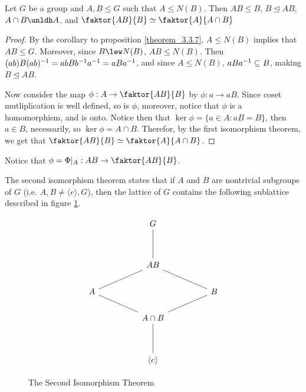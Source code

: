 \begin{theorem}\label{theorem_3.4.4}
  Let $G$ be a group and  $A,B \leq G$ such that  $A \leq N(B)$. Then $AB \leq
  B$,  $B \unlhd AB$,  $A \cap B \unldh A$, and  $\faktor{AB}{B} \simeq
  \faktor{A}{A \cap B}$
\end{theorem}
\begin{proof}
  By the corollary to proposition \ref{theorem_3.3.7}, $A \leq N(B)$ implies that
  $AB \leq G$. Moreover, since  $B \lew N(B)$, $AB \leq N(B)$. Then
  $(ab)B(ab)^{-1}=abBb^{-1}a^{-1}=aBa^{-1}$, and since $A \leq N(B)$,
  $aBa^{-1} \subseteq B$, making $B \unlhd AB$.

  Now consider the map $\phi:A \rightarrow \faktor{AB}{B}$ by $\phi:a
  \rightarrow aB$. Since coset mutliplication is well defined, so is $\phi$,
  moreover, notice that  $\phi$ is a homomorphism, and is onto. Notice then
  that  $\ker{\phi}=\{a \in A : aB=B\}$, then $a \in B$, necessarily, so
  $\ker{\phi}=A \cap B$. Therefor, by the first isomorphism theorem, we get
  that $\faktor{AB}{B} \simeq \faktor{A}{A \cap B}$.
\end{proof}
\begin{remark}
  Notice that $\phi=\Phi|_{A}:AB \rightarrow \faktor{AB}{B}$.
\end{remark}
\begin{remark}
  The second isomorphism theorem states that if $A$ and $B$ are nontrivial
  subgroups of $G$  (i.e. $A,B \neq \langle e \rangle, G$), then the lattice of
  $G$ contains the following sublattice described in figure
  \ref{figure_3.3}.
\end{remark}

\begin{figure}[h]
  \[\begin{tikzcd}
  && G \\
  \\
  && AB \\
    A &&&& B \\
      && {A \cap B} \\
      \\
      && {\langle e \rangle}
      \arrow[no head, from=1-3, to=3-3]
      \arrow[no head, from=3-3, to=4-1]
      \arrow[no head, from=4-1, to=5-3]
      \arrow[no head, from=5-3, to=4-5]
      \arrow[no head, from=4-5, to=3-3]
      \arrow[no head, from=5-3, to=7-3]
  \end{tikzcd}\]
  \caption{The Second Isomorphism Theorem}
  \label{figure_3.3}
\end{figure}

